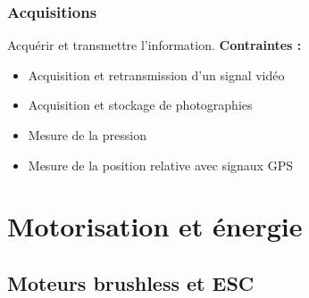 \documentclass[a4paper,11pt]{report}
\begin{document}
						\subsection{Acquisitions}
								Acquérir et transmettre l'information. \newline
								\textbf{Contraintes :}
								\begin{itemize}
										\item Acquisition et retransmission d'un signal vidéo
										\item Acquisition et stockage de photographies
										\item Mesure de la pression
										\item Mesure de la position relative avec signaux GPS
								\end{itemize}
								
\chapter{Motorisation et énergie}

				\section{Moteurs brushless et ESC} 
				
\end{document}
